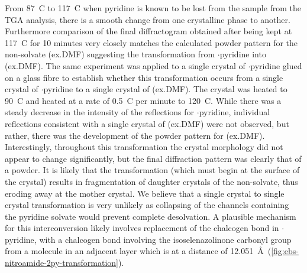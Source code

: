 \begin{refsection}
    From 87~\degree{}C to 117~\degree{}C when pyridine is known to be lost from the sample from the TGA analysis, there is a smooth change from one crystalline phase to another.
    Furthermore comparison of the final diffractogram obtained after being kept at 117~\degree{}C for 10 minutes very closely matches the calculated powder pattern for the non-solvate (ex.DMF) suggesting the transformation from $\cdot$pyridine into (ex.DMF).
    The same experiment was applied to a single crystal of $\cdot$pyridine glued on a glass fibre to establish whether this transformation occurs from a single crystal of $\cdot$pyridine to a single crystal of (ex.DMF).
    The crystal was heated to 90~\degree{}C and heated at a rate of 0.5~\degree{}C per minute to 120~\degree{}C.
    While there was a steady decrease in the intensity of the reflections for $\cdot$pyridine, individual reflections consistent with a single crystal of (ex.DMF) were not observed, but rather, there was the development of the powder pattern for (ex.DMF).
    Interestingly, throughout this transformation the crystal morphology did not appear to change significantly, but the final diffraction pattern was clearly that of a powder.
    It is likely that the transformation (which must begin at the surface of the crystal) results in fragmentation of daughter crystals of the non-solvate, thus eroding away at the mother crystal.
    We believe that a single crystal to single crystal transformation is very unlikely as collapsing of the channels containing the pyridine solvate would prevent complete desolvation.
    A plausible mechanism for this interconversion likely involves replacement of the  chalcogen bond in $\cdot$pyridine, with a  chalcogen bond involving the isoselenazolinone carbonyl group from a molecule in an adjacent layer which is at a distance of 12.051~\AA~(\cref{fig:ebs-nitroamide-2py-transformation}).
    

\end{refsection}
